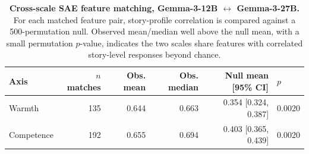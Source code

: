 \begin{table}[H]
\centering
\small
\begin{tabular}{@{}lrrrrl@{}}
\toprule
Axis & $n$ matches & Obs. mean & Obs. median & Null mean [95\% CI] & $p$ \\
\midrule
Warmth & 135 & 0.644 & 0.663 & 0.354 [0.324, 0.387] & 0.0020 \\
Competence & 192 & 0.655 & 0.694 & 0.403 [0.365, 0.439] & 0.0020 \\
\bottomrule
\end{tabular}
\caption{\textbf{Cross-scale SAE feature matching, Gemma-3-12B $\leftrightarrow$ Gemma-3-27B.} For each matched feature pair, story-profile correlation is compared against a 500-permutation null. Observed mean/median well above the null mean, with a small permutation $p$-value, indicates the two scales share features with correlated story-level responses beyond chance.}
\label{tab:gemma_scope_feature_matching}
\end{table}
